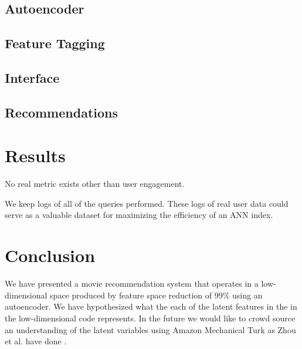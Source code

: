 \documentclass[conference]{IEEEtran}
\begin{document}
\subsection{Autoencoder}

\subsection{Feature Tagging}

\subsection{Interface}

\subsection{Recommendations}


\section{Results}
No real metric exists other than user engagement.

We keep logs of all of the queries performed.  These logs of real user data could serve as a valuable dataset for maximizing the efficiency of an ANN index.

\section{Conclusion} We have presented a movie recommendation system that
operates in a low-dimensional space produced by feature space reduction of
99\% using an autoencoder. We have hypothesized what the each of the latent
features in the in the low-dimensional code represents. In the future we would
like to crowd source an understanding of the latent variables using Amazon Mechanical Turk as Zhou et al. have done \cite{zhou2014object}.


\raggedright


\end{document}
